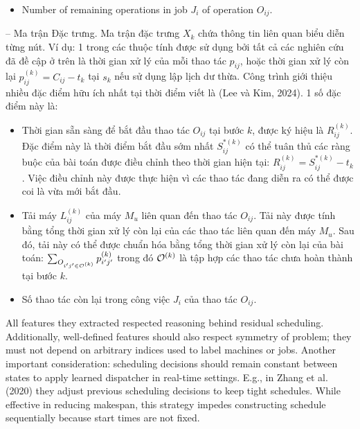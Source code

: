 \documentclass{article}
\begin{document}
\begin{itemize}
\begin{itemize}
\begin{itemize}
\begin{itemize}
                \item Number of remaining operations in job $J_i$ of operation $O_{ij}$.
            \end{itemize}
            -- {\sf Ma trận Đặc trưng.} Ma trận đặc trưng $X_k$ chứa thông tin liên quan biểu diễn từng nút. Ví dụ: 1 trong các thuộc tính được sử dụng bởi tất cả các nghiên cứu đã đề cập ở trên là thời gian xử lý của mỗi thao tác $p_{ij}$, hoặc thời gian xử lý còn lại $p_{ij}^{(k)} = C_{ij} - t_k$ tại $s_k$ nếu sử dụng lập lịch dư thừa. Công trình giới thiệu nhiều đặc điểm hữu ích nhất tại thời điểm viết là (Lee và Kim, 2024). 1 số đặc điểm này là:
            \begin{itemize}
                \item Thời gian sẵn sàng để bắt đầu thao tác $O_{ij}$ tại bước $k$, được ký hiệu là $R_{ij}^{(k)}$. Đặc điểm này là thời điểm bắt đầu sớm nhất $S_{ij}^{*(k)}$ có thể tuân thủ các ràng buộc của bài toán được điều chỉnh theo thời gian hiện tại: $R_{ij}^{(k)} = S_{ij}^{*(k)} - t_k$. Việc điều chỉnh này được thực hiện vì các thao tác đang diễn ra có thể được coi là vừa mới bắt đầu.
                \item Tải máy $L_{ij}^{(k)}$ của máy $M_u$ liên quan đến thao tác $O_{ij}$. Tải này được tính bằng tổng thời gian xử lý còn lại của các thao tác liên quan đến máy $M_u$. Sau đó, tải này có thể được chuẩn hóa bằng tổng thời gian xử lý còn lại của bài toán: $\sum_{O_{i'j'\in{\cal O}^{(k)}}} p_{i'j'}^{(k)}$ trong đó ${\cal O}^{(k)}$ là tập hợp các thao tác chưa hoàn thành tại bước $k$.
                \item Số thao tác còn lại trong công việc $J_i$ của thao tác $O_{ij}$.
            \end{itemize}
            All features they extracted respected reasoning behind residual scheduling. Additionally, well-defined features should also respect symmetry of problem; they must not depend on arbitrary indices used to label machines or jobs. Another important consideration: scheduling decisions should remain constant between states to apply learned dispatcher in real-time settings. E.g., in Zhang et al. (2020) they adjust previous scheduling decisions to keep tight schedules. While effective in reducing makespan, this strategy impedes constructing schedule sequentially because start times are not fixed.


\end{itemize}
\end{itemize}
\end{itemize}
\end{document}
